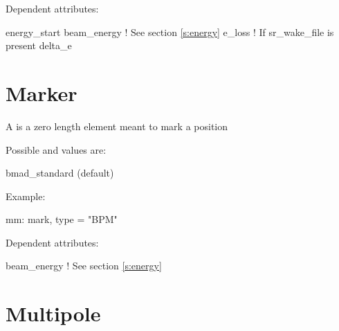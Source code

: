 \vskip0.2in \noindent
Dependent attributes:
\begin{example}
  energy\_start
  beam\_energy  ! See section \ref{s:energy}
  e\_loss       ! If sr\_wake\_file is present
  delta\_e
\end{example}

\section{Marker}
\label{s:mark}

A  is a zero length element meant to mark a position

\begin{table}[h]
\end{table}

\vskip0.2in \noindent
Possible  and  values are:
\vskip 0.01in
\begin{example}
  bmad\_standard (default)
\end{example}

\vskip0.2in \noindent
Example:
\begin{example}
  mm: mark, type = "BPM"
\end{example}

\vskip0.2in \noindent
Dependent attributes:
\begin{example}
  beam\_energy  ! See section \ref{s:energy}
\end{example}

\section{Multipole}
\label{s:mult}

